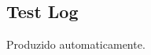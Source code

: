 \documentclass[12pt,letterpaper]{article}
\begin{document}
\pagebreak

\subsection{Test Log}

Produzido automaticamente. %


%
\end{document}
